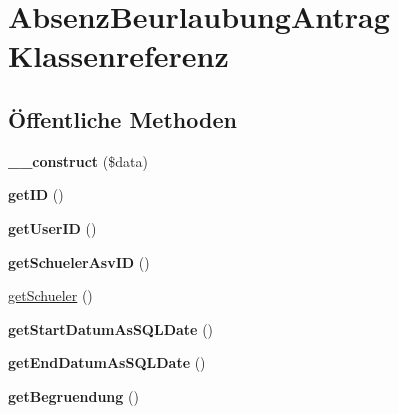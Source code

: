 \hypertarget{class_absenz_beurlaubung_antrag}{}\section{Absenz\+Beurlaubung\+Antrag Klassenreferenz}
\label{class_absenz_beurlaubung_antrag}
\subsection*{Öffentliche Methoden}
\begin{DoxyCompactItemize}
\item 
\mbox{\label{class_absenz_beurlaubung_antrag_ae47cf5105954a7af2b843addfe4bca21}} 
{\bfseries \+\_\+\+\_\+construct} (\$data)
\item 
\mbox{\label{class_absenz_beurlaubung_antrag_a311a82db75c00dee21030aa301660177}} 
{\bfseries get\+ID} ()
\item 
\mbox{\label{class_absenz_beurlaubung_antrag_a8738daa06173f81ded060051da5cfe17}} 
{\bfseries get\+User\+ID} ()
\item 
\mbox{\label{class_absenz_beurlaubung_antrag_a21912ecf1c25a731dc83b733d7f5b1af}} 
{\bfseries get\+Schueler\+Asv\+ID} ()
\item 
\mbox{\hyperlink{class_absenz_beurlaubung_antrag_a86cdc543989ecd75267bb9cbe9c76b48}{get\+Schueler}} ()
\item 
\mbox{\label{class_absenz_beurlaubung_antrag_aafc753d1cadc7a6584ba3faa2b663bae}} 
{\bfseries get\+Start\+Datum\+As\+S\+Q\+L\+Date} ()
\item 
\mbox{\label{class_absenz_beurlaubung_antrag_ac7aeaf6e83b61e8605551698b6afe272}} 
{\bfseries get\+End\+Datum\+As\+S\+Q\+L\+Date} ()
\item 
\mbox{\label{class_absenz_beurlaubung_antrag_ae8b8bfc610903d30f43113cca54e3f34}} 
{\bfseries get\+Begruendung} ()
\item 
\mbox{\label{class_absenz_beurlaubung_antrag_a3539b189377ab2ad81772a7e03d345fa}} 

\end{DoxyCompactItemize}
